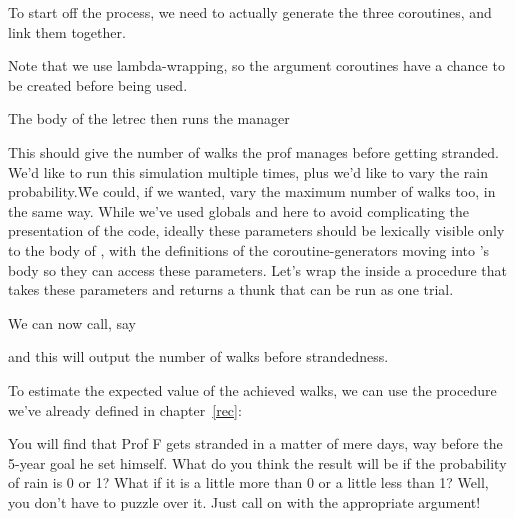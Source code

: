 To start off the process, we need to actually generate the three
coroutines, and link them together.



\n Note that we use lambda-wrapping, so the argument coroutines have
a chance to be created before being used.

The body of the letrec then runs the manager



This should give the number of walks the prof manages before
getting stranded. We'd like to run this simulation multiple
times, plus we'd like to vary the rain probability.\f{We could,
if we wanted, vary the maximum number of walks too, in the same
way. While we’ve used globals  and
 here to avoid complicating the presentation
of the code, ideally these parameters should be lexically visible
only to the body of , with the definitions of
the coroutine-generators moving into ’s body so
they can access these parameters.} Let's wrap the  inside a
procedure that takes these parameters and returns a thunk that
can be run as one trial.


\n We can now call, say


\n and this will output the number of walks before strandedness.

To estimate the expected value of the achieved walks,
we can use the  procedure we’ve already defined in
chapter~\ref{rec}:


\n You will find that Prof F gets stranded in a matter of mere
days, way before the 5-year goal he set himself.  What do you
think the result will be if the probability of rain is 0 or 1?
What if it is a little more than 0 or a little less than 1? Well,
you don’t have to puzzle over it. Just call  on
 with the appropriate argument!
